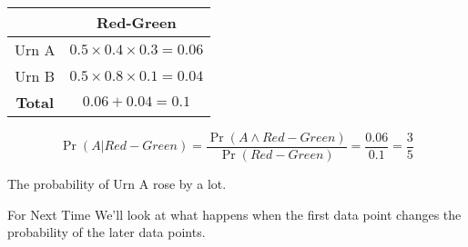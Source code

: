 \documentclass[
  ignorenonframetext,
]{beamer}
\renewcommand{\,}{\text{, }}
\begin{document}
\begin{frame}
\begin{longtable}[]{@{}cc@{}}
\toprule
& Red-Green \\
\midrule
\endhead
Urn A & \(0.5 \times 0.4 \times 0.3 = 0.06\) \\
Urn B & \(0.5 \times 0.8 \times 0.1 = 0.04\) \\
\textbf{Total} & \(0.06 + 0.04 = 0.1\) \\
\bottomrule
\end{longtable}

\[
\Pr(A | Red-Green) = \frac{\Pr(A \wedge Red-Green)}{\Pr(Red-Green)} = \frac{0.06}{0.1} = \frac{3}{5}
\]

\bigskip

The probability of Urn A rose by a lot.
\end{frame}

\begin{frame}{For Next Time}
\protect\hypertarget{for-next-time}{}
We'll look at what happens when the first data point changes the
probability of the later data points.
\end{frame}
\end{document}
